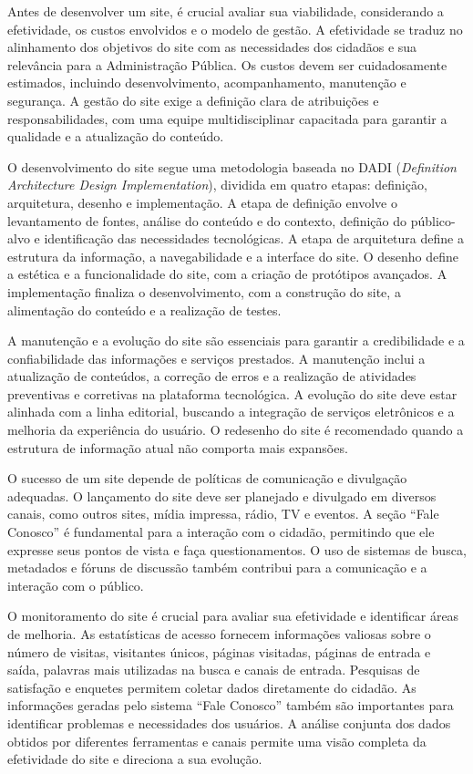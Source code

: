 \documentclass[
  12pt,
  openright,
  twoside,
  a4paper,
  english,
  french,
  spanish,
  brazil
]{abntex2}
\begin{document}
Antes de desenvolver um site, é crucial avaliar sua viabilidade, considerando a
efetividade, os custos envolvidos e o modelo de gestão. A efetividade se traduz
no alinhamento dos objetivos do site com as necessidades dos cidadãos e sua
relevância para a Administração Pública. Os custos devem ser cuidadosamente
estimados, incluindo desenvolvimento, acompanhamento, manutenção e segurança. A
gestão do site exige a definição clara de atribuições e responsabilidades, com
uma equipe multidisciplinar capacitada para garantir a qualidade e a atualização
do conteúdo.

O desenvolvimento do site segue uma metodologia baseada no DADI
(\textit{Definition Architecture Design Implementation}), dividida em quatro
etapas: definição, arquitetura, desenho e implementação. A etapa de definição
envolve o levantamento de fontes, análise do conteúdo e do contexto, definição
do público-alvo e identificação das necessidades tecnológicas. A etapa de
arquitetura define a estrutura da informação, a navegabilidade e a interface do
site. O desenho define a estética e a funcionalidade do site, com a criação de
protótipos avançados. A implementação finaliza o desenvolvimento, com a
construção do site, a alimentação do conteúdo e a realização de testes.

A manutenção e a evolução do site são essenciais para garantir a credibilidade e
a confiabilidade das informações e serviços prestados. A manutenção inclui a
atualização de conteúdos, a correção de erros e a realização de atividades
preventivas e corretivas na plataforma tecnológica. A evolução do site deve
estar alinhada com a linha editorial, buscando a integração de serviços
eletrônicos e a melhoria da experiência do usuário. O redesenho do site é
recomendado quando a estrutura de informação atual não comporta mais expansões.

O sucesso de um site depende de políticas de comunicação e divulgação adequadas.
O lançamento do site deve ser planejado e divulgado em diversos canais, como
outros sites, mídia impressa, rádio, TV e eventos. A seção ``Fale Conosco'' é
fundamental para a interação com o cidadão, permitindo que ele expresse seus
pontos de vista e faça questionamentos. O uso de sistemas de busca, metadados e
fóruns de discussão também contribui para a comunicação e a interação com o
público.

O monitoramento do site é crucial para avaliar sua efetividade e identificar
áreas de melhoria. As estatísticas de acesso fornecem informações valiosas sobre
o número de visitas, visitantes únicos, páginas visitadas, páginas de entrada e
saída, palavras mais utilizadas na busca e canais de entrada. Pesquisas de
satisfação e enquetes permitem coletar dados diretamente do cidadão. As
informações geradas pelo sistema ``Fale Conosco'' também são importantes para
identificar problemas e necessidades dos usuários. A análise conjunta dos dados
obtidos por diferentes ferramentas e canais permite uma visão completa da
efetividade do site e direciona a sua evolução.
\end{document}
